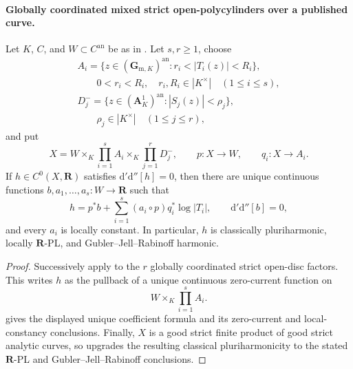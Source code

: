 \paragraph{Globally coordinated mixed strict open-polycylinders over a published curve.}
\begin{corollary}
\label{cor:p062-open-polycylinder-products-over-curves}
Let \(K\), \(C\), and \(W\subset C^{\mathrm{an}}\) be as in
.  Let \(s,r\geq1\), choose
\[
 \begin{gathered}
 A_i=\{z\in(\mathbf G_{\mathrm m,K})^{\mathrm{an}}:
                     r_i<|T_i(z)|<R_i\},\\
 \qquad 0<r_i<R_i,\quad r_i,R_i\in|K^\times|
       \quad(1\leq i\leq s),\\
 D_j^-=\{z\in(\mathbf A^1_K)^{\mathrm{an}}:|S_j(z)|<\rho_j\},\\
 \qquad \rho_j\in|K^\times|
       \quad(1\leq j\leq r),
 \end{gathered}
\]
and put
\[
 X=W\times_K\prod_{i=1}^sA_i\times_K\prod_{j=1}^rD_j^-,
 \qquad p:X\longrightarrow W,
 \qquad q_i:X\longrightarrow A_i.
\]
If \(h\in C^0(X,\mathbf R)\) satisfies
\(\mathrm d'\mathrm d''[h]=0\), then there are unique continuous
functions \(b,a_1,\ldots,a_s:W\to\mathbf R\) such that
\[
 h=p^*b+\sum_{i=1}^s(a_i\circ p)q_i^*\log|T_i|,
 \qquad \mathrm d'\mathrm d''[b]=0,
\]
and every \(a_i\) is locally constant.  In particular, \(h\) is classically
pluriharmonic, locally \(\mathbf R\)-PL, and Gubler--Jell--Rabinoff harmonic.
\end{corollary}

\begin{proof}
Successively apply  to the \(r\) globally
coordinated strict open-disc factors.  This writes \(h\) as the pullback of
a unique continuous zero-current function on
\[
                         W\times_K\prod_{i=1}^sA_i.
\]
 gives the displayed
unique coefficient formula and its zero-current and local-constancy
conclusions.  Finally, \(X\) is a good strict finite product of good strict
analytic curves, so  upgrades
the resulting classical pluriharmonicity to the stated
\(\mathbf R\)-PL and Gubler--Jell--Rabinoff conclusions.
\end{proof}

